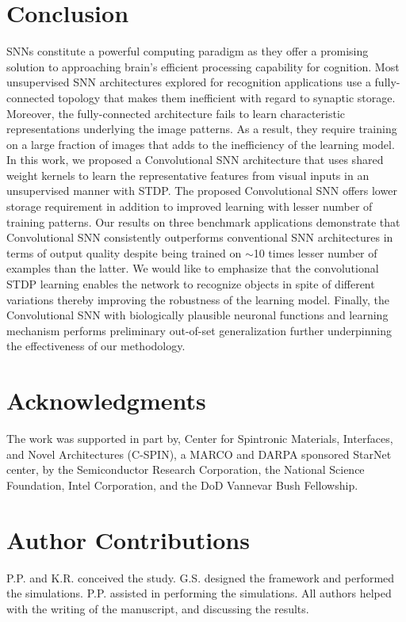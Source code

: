 \documentclass[journal, onecolumn]{IEEEtran}
\begin{document}
\section*{\large\bf{Conclusion}}
SNNs constitute a powerful computing paradigm as they offer a promising solution to approaching brain’s efficient processing capability for cognition. Most unsupervised SNN architectures explored for recognition applications use a fully-connected topology that makes them inefficient with regard to synaptic storage. Moreover, the fully-connected architecture fails to learn characteristic representations underlying the image patterns. As a result, they require training on a large fraction of images that adds to the inefficiency of the learning model. In this work, we proposed a Convolutional SNN architecture that uses shared weight kernels to learn the representative features from visual inputs in an unsupervised manner with STDP. The proposed Convolutional SNN offers lower storage requirement in addition to improved learning with lesser number of training patterns. Our results on three benchmark applications demonstrate that Convolutional SNN consistently outperforms conventional SNN architectures in terms of output quality despite being trained on $\sim$10 times lesser number of examples than the latter. We would like to emphasize that the convolutional STDP learning enables the network to recognize objects in spite of different variations thereby improving the robustness of the learning model. Finally, the Convolutional SNN with biologically plausible neuronal functions and learning mechanism performs preliminary out-of-set generalization further underpinning the effectiveness of our methodology.

\section*{\large\bf{Acknowledgments}}
The work was supported in part by, Center for Spintronic Materials, Interfaces, and Novel Architectures (C-SPIN), a MARCO and DARPA sponsored StarNet center, by the Semiconductor Research Corporation, the National Science Foundation, Intel Corporation, and the DoD Vannevar Bush Fellowship.

\section*{\large\bf{Author Contributions}}
P.P. and K.R. conceived the study. G.S. designed the framework and performed the simulations. P.P. assisted in performing the simulations. All authors helped with the writing of the manuscript, and discussing the results.
\end{document}
